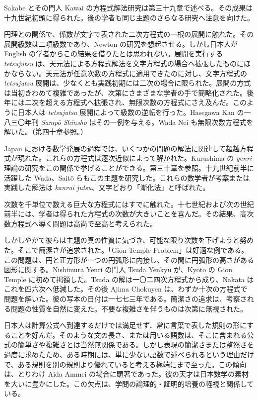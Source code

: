 \documentclass[11pt]{article}
\newcommand{\scanpage}[2]{\clearpage\setcounter{footnote}{0}\noindent{\footnotesize\color{gray}PDF #1 頁 · #2}\par\medskip}
\newcommand{\scanfooter}{}
\begin{document}
Sakabe とその門人 Kawai の方程式解法研究は第三十九章で述べる。その成果は十九世紀初頭に得られた。後の学者も同じ主題のさらなる研究へ注意を向けた。

円理との関係で、係数が文字で表された二次方程式の一根の展開に触れた。その展開級数は二項級数であり、Newton の研究を想起させる。しかし日本人が English の学者からこの結果を借りたとは思われない。展開を実行する \emph{tetsujutsu} は、天元法による方程式解法を文字方程式の場合へ拡張したものにほかならない。天元法が任意次数の方程式に適用できたのに対し、文字方程式の \emph{tetsujutsu} 展開は、少なくとも実践初期には二次の場合に限られた。展開の方式は当初きわめて複雑であったが、次第にさまざまな学者の手で簡略化された。後年には二次を超える方程式へ拡張され、無限次数の方程式にさえ及んだ。このように日本人は \emph{tetsujutsu} 展開によって級数の逆転を行った。Hasegawa Kan の一八三〇年刊 \emph{Sampō Shinsho} はその一例を与える。Wada Nei も無限次数方程式を解いた。（第四十章参照。）

Japan における数学発展の過程では、いくつかの問題の解法に関連して超越方程式が現れた。これらの方程式は逐次近似によって解かれた。Kurushima の \emph{yenri} 理論の研究をこの関係で挙げることができる。第三十章を参照。十九世紀前半に活躍した Wada、Saitō らもこの主題を研究した。これらの数学者が考案または実践した解法は \emph{kanrui jutsu}、文字どおり「漸化法」と呼ばれた。

次数を千単位で数える巨大な方程式にはすでに触れた。十七世紀および次の世紀前半には、学者は得られた方程式の次数が大きいことを喜んだ。その結果、高次数方程式へ導く問題は高尚で至高と考えられた。
\scanfooter

\scanpage{0182}{第22章、印刷頁168}
しかしやがて彼らは主題の真の性質に気づき、可能な限り次数を下げようと努めた。そこで簡潔さが追求された。「Gion Temple Problem」は好適な例である。この問題は、円と正方形が一つの円弧形に内接し、その間に円弧形の高さがある図形に関する。Nishimura Yenri の門人 Tsuda Yenkyū が、Kyōto の Gion Temple に初めて掲額した。Tsuda の解は一〇二四次方程式から成り、Nakata はこれを四六次へ低減した。その後 Ajima Chokuyen は、わずか十次の方程式で問題を解いた。彼の写本の日付は一七七三年である。簡潔さの追求は、考察される問題の性質を自然に変えた。不要な複雑さを伴うものは次第に無視された。

日本人は計算公式へ到達するだけでは満足せず、常に言葉で表した規則の形にすることを好んだ。そのような文の長さ、または用いる語数は、そこに含まれる公式の簡単さや複雑さとは当然無関係である。しかし表現の簡潔さまたは整然さを過度に求めたため、ある時期には、単に少ない語数で述べられるという理由だけで、ある規則を別の規則より優れていると考える極端にまで至った。この傾向は、とりわけ Aida Ammei の場合に顕著であった。彼の天才は日本数学の素材を大いに豊かにした。この欠点は、学問の論理的・証明的培養の軽視と関係している。
\end{document}
